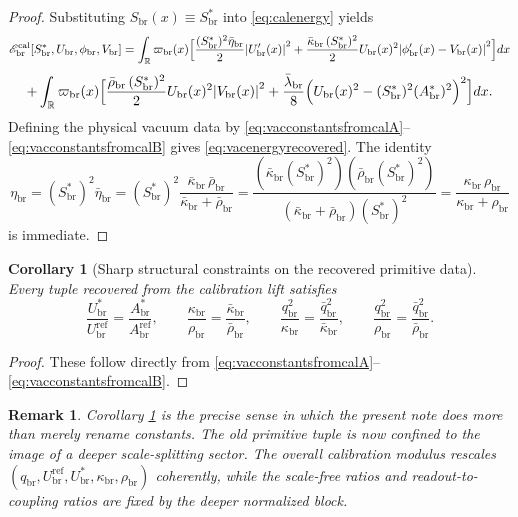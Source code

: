 \documentclass[11pt]{article}
\newcommand{\ProfWeight}{\varpi_{\mathrm{br}}}
\newcommand{\RespVacAmp}{U_{\mathrm{br}}}
\newcommand{\RespVacRef}{U_{\mathrm{br}}^{\mathrm{ref}}}
\newcommand{\RespVacEq}{U_{\mathrm{br}}^{\ast}}
\newcommand{\RespVacPhase}{\phi_{\mathrm{br}}}
\newcommand{\RespVacCarrier}{V_{\mathrm{br}}}
\newcommand{\RespVacReadout}{q_{\mathrm{br}}}
\newcommand{\RespVacCov}{\kappa_{\mathrm{br}}}
\newcommand{\RespVacRelax}{\rho_{\mathrm{br}}}
\newcommand{\RespVacIso}{\eta_{\mathrm{br}}}
\newcommand{\RespScaleField}{S_{\mathrm{br}}}
\newcommand{\RespScaleEq}{S_{\mathrm{br}}^{\ast}}
\newcommand{\RespScaleAmpRef}{A_{\mathrm{br}}^{\mathrm{ref}}}
\newcommand{\RespScaleAmpEq}{A_{\mathrm{br}}^{\ast}}
\newcommand{\RespScaleReadout}{\bar q_{\mathrm{br}}}
\newcommand{\RespScaleCov}{\bar\kappa_{\mathrm{br}}}
\newcommand{\RespScaleRelax}{\bar\rho_{\mathrm{br}}}
\newcommand{\RespScaleWell}{\bar\lambda_{\mathrm{br}}}
\newcommand{\RespScaleIso}{\bar\eta_{\mathrm{br}}}
\newcommand{\RespScaleEnergy}{\mathscr E_{\mathrm{br}}^{\mathrm{cal}}}
\newtheorem{remark}{Remark}
\newtheorem{corollary}{Corollary}
\begin{document}
\begin{proof}
Substituting \(\RespScaleField(x)\equiv \RespScaleEq\) into \eqref{eq:calenergy} yields
\[
\RespScaleEnergy[\RespScaleEq,\RespVacAmp,\RespVacPhase,\RespVacCarrier]
=
\int_{\mathbb R}\ProfWeight(x)\Bigl[
\frac{(\RespScaleEq)^2\RespScaleIso}{2}\abs{\RespVacAmp'(x)}^2
+
\frac{\RespScaleCov\,(\RespScaleEq)^2}{2}\RespVacAmp(x)^2\abs{\RespVacPhase'(x)-\RespVacCarrier(x)}^2
\Bigr]dx
\]
\[
+\int_{\mathbb R}\ProfWeight(x)\Bigl[
\frac{\RespScaleRelax\,(\RespScaleEq)^2}{2}\RespVacAmp(x)^2\abs{\RespVacCarrier(x)}^2
+
\frac{\RespScaleWell}{8}\Bigl(\RespVacAmp(x)^2-(\RespScaleEq)^2(\RespScaleAmpEq)^2\Bigr)^2
\Bigr]dx.
\]
Defining the physical vacuum data by \eqref{eq:vacconstantsfromcalA}--\eqref{eq:vacconstantsfromcalB} gives \eqref{eq:vacenergyrecovered}. The identity
\[
\RespVacIso=(\RespScaleEq)^2\RespScaleIso
=
(\RespScaleEq)^2\frac{\RespScaleCov\,\RespScaleRelax}{\RespScaleCov+\RespScaleRelax}
=
\frac{(\RespScaleCov(\RespScaleEq)^2)(\RespScaleRelax(\RespScaleEq)^2)}
 {(\RespScaleCov+\RespScaleRelax)(\RespScaleEq)^2}
=
\frac{\RespVacCov\,\RespVacRelax}{\RespVacCov+\RespVacRelax}
\]
is immediate.
\end{proof}

\begin{corollary}[Sharp structural constraints on the recovered primitive data]
\label{cor:sharpconstraints}
Every tuple recovered from the calibration lift satisfies
\begin{equation}
\frac{\RespVacEq}{\RespVacRef}=\frac{\RespScaleAmpEq}{\RespScaleAmpRef},
\qquad
\frac{\RespVacCov}{\RespVacRelax}=\frac{\RespScaleCov}{\RespScaleRelax},
\qquad
\frac{\RespVacReadout^2}{\RespVacCov}=\frac{\RespScaleReadout^2}{\RespScaleCov},
\qquad
\frac{\RespVacReadout^2}{\RespVacRelax}=\frac{\RespScaleReadout^2}{\RespScaleRelax}.
\label{eq:sharpconstraints}
\end{equation}
\end{corollary}

\begin{proof}
These follow directly from \eqref{eq:vacconstantsfromcalA}--\eqref{eq:vacconstantsfromcalB}.
\end{proof}

\begin{remark}
Corollary \ref{cor:sharpconstraints} is the precise sense in which the present note does more than merely rename constants. The old primitive tuple is now confined to the image of a deeper scale-splitting sector. The overall calibration modulus rescales \((\RespVacReadout,\RespVacRef,\RespVacEq,\RespVacCov,\RespVacRelax)\) coherently, while the scale-free ratios and readout-to-coupling ratios are fixed by the deeper normalized block.
\end{remark}
\end{document}
